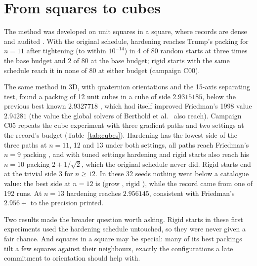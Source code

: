 \section{From squares to cubes}\label{sec:story}
The method was developed on unit squares in a square, where records are dense and audited \cite{squaresproject,friedmansurvey}. With the original schedule, hardening reaches Trump's packing for $n=11$ \cite{trump} after tightening (to within $10^{-14}$) in 4 of 80 random starts at three times the base budget and 2 of 80 at the base budget; rigid starts with the same schedule reach it in none of 80 at either budget (campaign C00).

The same method in 3D, with quaternion orientations and the 15-axis separating test, found a packing of 12 unit cubes in a cube of side $2.9315185$, below the previous best known $2.9327718$ \cite{hyra,nakajima12}, which had itself improved Friedman's 1998 value $2.94281$ \cite{friedmancubes} (the value the global solvers of Berthold et al.\ \cite{Berthold2026} also reach). Campaign C05 repeats the cube experiment with three gradient paths and two settings at the record's budget (Table~\ref{tab:cubes}). Hardening has the lowest side of the three paths at $n=11$, 12 and 13 under both settings, all paths reach Friedman's $n=9$ packing \cite{friedmancubes}, and with tuned settings hardening and rigid starts also reach his $n=10$ packing $2+1/\sqrt2$, which the original schedule never did. Rigid starts end at the trivial side 3 for $n\ge12$. In these 32 seeds nothing went below a catalogue value: the best side at $n=12$ is \CubesHardenTwelve{} (grow \CubesGrowTwelve, rigid \CubesRigidTwelve), while the record came from one of 192 runs. At $n=13$ hardening reaches $2.956145$, consistent with Friedman's $2.956+$ \cite{friedmancubes} to the precision printed.



Two results made the broader question worth asking. Rigid starts in these first experiments used the hardening schedule untouched, so they were never given a fair chance. And squares in a square may be special: many of its best packings tilt a few squares against their neighbours, exactly the configurations a late commitment to orientation should help with.
